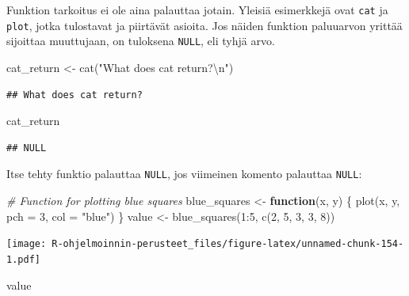 \documentclass[
]{book}
\newenvironment{Shaded}{\begin{snugshade}}{\end{snugshade}}
\newcommand{\AttributeTok}[1]{\textcolor[rgb]{0.77,0.63,0.00}{#1}}
\newcommand{\CommentTok}[1]{\textcolor[rgb]{0.56,0.35,0.01}{\textit{#1}}}
\newcommand{\ControlFlowTok}[1]{\textcolor[rgb]{0.13,0.29,0.53}{\textbf{#1}}}
\newcommand{\DecValTok}[1]{\textcolor[rgb]{0.00,0.00,0.81}{#1}}
\newcommand{\FunctionTok}[1]{\textcolor[rgb]{0.00,0.00,0.00}{#1}}
\newcommand{\NormalTok}[1]{#1}
\newcommand{\OtherTok}[1]{\textcolor[rgb]{0.56,0.35,0.01}{#1}}
\newcommand{\SpecialCharTok}[1]{\textcolor[rgb]{0.00,0.00,0.00}{#1}}
\newcommand{\StringTok}[1]{\textcolor[rgb]{0.31,0.60,0.02}{#1}}
\begin{document}
Funktion tarkoitus ei ole aina palauttaa jotain. Yleisiä esimerkkejä ovat \texttt{cat} ja \texttt{plot}, jotka tulostavat ja piirtävät asioita. Jos näiden funktion paluuarvon yrittää sijoittaa muuttujaan, on tuloksena \texttt{NULL}, eli tyhjä arvo.

\begin{Shaded}
\begin{Highlighting}[]
\NormalTok{cat\_return }\OtherTok{\textless{}{-}} \FunctionTok{cat}\NormalTok{(}\StringTok{"What does cat return?}\SpecialCharTok{\textbackslash{}n}\StringTok{"}\NormalTok{)}
\end{Highlighting}
\end{Shaded}

\begin{verbatim}
## What does cat return?
\end{verbatim}

\begin{Shaded}
\begin{Highlighting}[]
\NormalTok{cat\_return}
\end{Highlighting}
\end{Shaded}

\begin{verbatim}
## NULL
\end{verbatim}

Itse tehty funktio palauttaa \texttt{NULL}, jos viimeinen komento palauttaa \texttt{NULL}:

\begin{Shaded}
\begin{Highlighting}[]
\CommentTok{\# Function for plotting blue squares}
\NormalTok{blue\_squares }\OtherTok{\textless{}{-}} \ControlFlowTok{function}\NormalTok{(x, y) \{}
  \FunctionTok{plot}\NormalTok{(x, y, }\AttributeTok{pch =} \DecValTok{3}\NormalTok{, }\AttributeTok{col =} \StringTok{"blue"}\NormalTok{)}
\NormalTok{\}}
\NormalTok{value }\OtherTok{\textless{}{-}} \FunctionTok{blue\_squares}\NormalTok{(}\DecValTok{1}\SpecialCharTok{:}\DecValTok{5}\NormalTok{, }\FunctionTok{c}\NormalTok{(}\DecValTok{2}\NormalTok{, }\DecValTok{5}\NormalTok{, }\DecValTok{3}\NormalTok{, }\DecValTok{3}\NormalTok{, }\DecValTok{8}\NormalTok{))}
\end{Highlighting}
\end{Shaded}

\texttt{[image: R-ohjelmoinnin-perusteet\_files/figure-latex/unnamed-chunk-154-1.pdf]}

\begin{Shaded}
\begin{Highlighting}[]
\NormalTok{value}
\end{Highlighting}
\end{Shaded}
\end{document}
